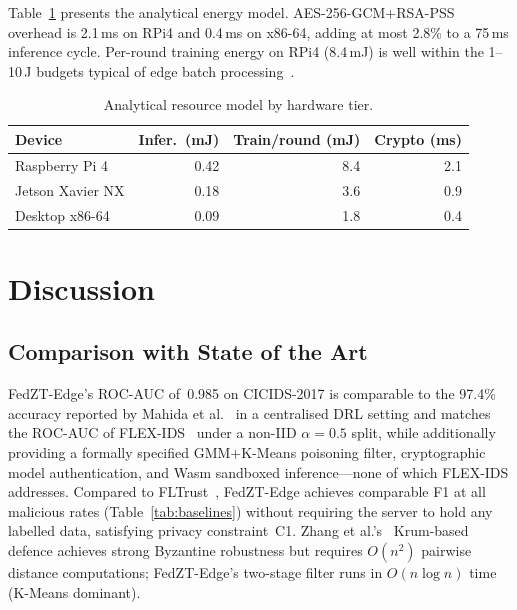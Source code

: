 \documentclass[11pt,a4paper,twocolumn]{article}
\theoremstyle{definition}
\begin{document}
Table~\ref{tab:energy} presents the analytical energy model.
AES-256-GCM+RSA-PSS overhead is 2.1\,ms on RPi4 and 0.4\,ms on x86-64,
adding at most 2.8\% to a 75\,ms inference cycle.
Per-round training energy on RPi4 (8.4\,mJ) is well within the 1--10\,J
budgets typical of edge batch processing~\cite{weber2026}.

\begin{table}[htbp]
\caption{Analytical resource model by hardware tier.}
\label{tab:energy}
\centering\scriptsize
\setlength{\tabcolsep}{5pt}
\begin{tabular}{@{}lrrr@{}}
\toprule
\textbf{Device} & Infer.\ (mJ) & Train/round (mJ) & Crypto (ms) \\
\midrule
Raspberry Pi 4   & 0.42 & 8.4 & 2.1 \\
Jetson Xavier NX & 0.18 & 3.6 & 0.9 \\
Desktop x86-64   & 0.09 & 1.8 & 0.4 \\
\bottomrule
\end{tabular}
\end{table}

\section{Discussion}
\label{sec:discussion}

\subsection{Comparison with State of the Art}

FedZT-Edge's ROC-AUC of~0.985 on CICIDS-2017 is comparable to the 97.4\%
accuracy reported by Mahida et al.~\cite{mahida2026} in a centralised DRL
setting and matches the ROC-AUC of FLEX-IDS~\cite{flexids} under a
non-IID $\alpha=0.5$ split, while additionally providing a formally
specified GMM+K-Means poisoning filter, cryptographic model authentication,
and Wasm sandboxed inference---none of which FLEX-IDS addresses.
Compared to FLTrust~\cite{cao2022}, FedZT-Edge achieves comparable F1
at all malicious rates (Table~\ref{tab:baselines}) without requiring the
server to hold any labelled data, satisfying privacy constraint~C1.
Zhang et al.'s~\cite{zhang2025} Krum-based defence achieves strong
Byzantine robustness but requires $O(n^2)$ pairwise distance computations;
FedZT-Edge's two-stage filter runs in $O(n\log n)$ time (K-Means dominant).
\end{document}
